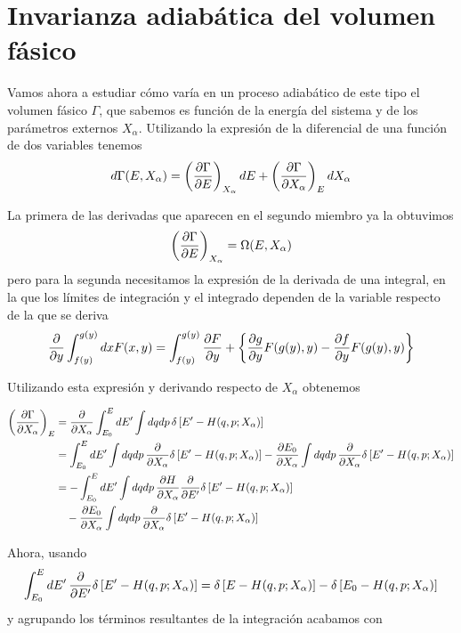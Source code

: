 \section{Invarianza adiabática del volumen fásico}

Vamos ahora a estudiar cómo varía en un proceso adiabático de este tipo el volumen fásico $\Gamma$, que sabemos es función de la energía del sistema y de los parámetros externos $X_\alpha$. Utilizando la expresión de la diferencial de una función de dos variables tenemos
\begin{equation}
	d\Gamma(E,X_\alpha) = \left( \pdv{\Gamma}{E} \right)_{X_\alpha} dE + \left( \pdv{\Gamma}{X_\alpha} \right)_{E} dX_\alpha
\end{equation}

La primera de las derivadas que aparecen en el segundo miembro ya la obtuvimos 
\begin{equation}\label{eq:Gamma_E_t1}
	\left( \pdv{\Gamma}{E} \right)_{X_\alpha} = \Omega(E,X_\alpha) 
\end{equation}
pero para la segunda necesitamos la expresión de la derivada de una integral, en la que los límites de integración y el integrado dependen de la variable respecto de la que se deriva
\begin{equation}
	\pdv{y} \int^{g(y)}_{f(y)} dx F(x,y) = \int^{g(y)}_{f(y)} \pdv{F}{y} + \left\lbrace \pdv{g}{y}F(g(y),y)- \pdv{f}{y}F(g(y),y) \right\rbrace
\end{equation}

Utilizando esta expresión y derivando respecto de $X_\alpha$ obtenemos

\begin{align*}
	\left( \pdv{\Gamma}{X_\alpha} \right)_{E} &= \pdv{X_\alpha} \int^E_{E_0} dE' \int dq dp \, \delta \left[ E' - H(q,p;X_\alpha) \right] \\
	&=  \int^E_{E_0} dE' \int dq dp \, \pdv{X_\alpha} \delta \left[ E' - H(q,p;X_\alpha) \right]  - \pdv{E_0}{X_\alpha} \int dq dp \, \pdv{X_\alpha} \delta \left[ E' - H(q,p;X_\alpha) \right] \\
	&=  - \int^E_{E_0} dE' \int dq dp \, \pdv{H}{X_\alpha} \pdv{E'} \delta \left[ E' - H(q,p;X_\alpha) \right] \\ 
	& \quad - \pdv{E_0}{X_\alpha} \int dq dp \, \pdv{X_\alpha} \delta \left[ E' - H(q,p;X_\alpha) \right]
\end{align*}

Ahora, usando
$$\int^E_{E_0} \dd{E'} \pdv{E'} \delta \left[ E' - H(q,p;X_\alpha) \right] = \delta \left[ E - H(q,p;X_\alpha) \right]  - \delta \left[ E_0 - H(q,p;X_\alpha) \right] $$
y agrupando los términos resultantes de la integración acabamos con

